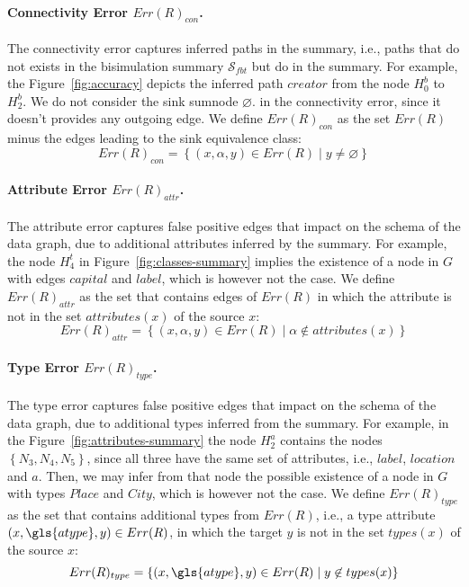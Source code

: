 \paragraph{Connectivity Error $Err(R)_{con}$.}

The connectivity error captures inferred paths in the summary, i.e., paths that do not exists in the bisimulation summary $\mathcal{S}_{fbt}$ but do in the summary. For example, the Figure~\ref{fig:accuracy} depicts the inferred path $creator$ from the node $H^b_0$ to $H^b_2$.
We do not consider the sink sumnode $\varnothing$. in the connectivity error, since it doesn't provides any outgoing edge. We define $Err(R)_{con}$ as the set $Err(R)$ minus the edges leading to the sink equivalence class:
$$
Err(R)_{con} = \left\lbrace (x, \alpha, y) \in Err(R) \mid y \neq \varnothing \right\rbrace
$$

\paragraph{Attribute Error $Err(R)_{attr}$.}

The attribute error captures false positive edges that impact on the schema of the data graph, due to additional attributes inferred by the summary. For example, the node $H^t_4$ in Figure~\ref{fig:classes-summary} implies the existence of a node in $G$ with edges $capital$ and $label$, which is however not the case. We define $Err(R)_{attr}$ as the set that contains edges of $Err(R)$ in which the attribute is not in the set $attributes(x)$ of the source $x$:
$$
Err(R)_{attr} = \left\lbrace (x, \alpha, y) \in Err(R) \mid \alpha \not \in attributes(x) \right\rbrace
$$

\paragraph{Type Error $Err(R)_{type}$.}

The type error captures false positive edges that impact on the schema of the data graph, due to additional types inferred from the summary.
For example, in the Figure~\ref{fig:attributes-summary} the node $H^a_2$ contains the nodes $\left\lbrace N_3, N_4, N_5 \right\rbrace$, since all three have the same set of attributes, i.e., $label$, $location$ and $a$. Then, we may infer from that node the possible existence of a node in $G$ with types $Place$ and $City$, which is however not the case. We define $Err(R)_{type}$ as the set that contains additional types from $Err(R)$, i.e., a type attribute $(x, \gls{atype}, y) \in Err(R)$, in which the target $y$ is not in the set $types(x)$ of the source $x$:
$$
Err(R)_{type} = \left\lbrace (x, \gls{atype}, y) \in Err(R) \mid y \not \in types(x) \right\rbrace
$$

